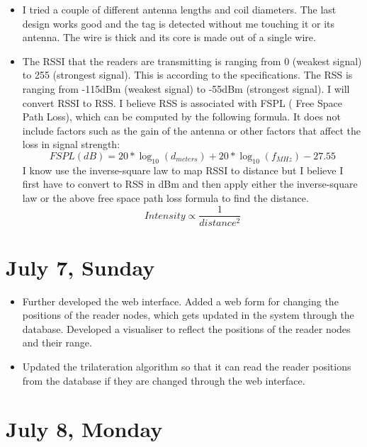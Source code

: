 \documentclass[a4paper,12pt]{article}
\begin{document}
\begin{itemize}
	\item I tried a couple of different antenna lengths and coil diameters. The last design works good and the tag is detected without me touching it or its antenna. The wire is thick and its core is made out of a single wire.
	\item The RSSI that the readers are transmitting is ranging from 0 (weakest signal) to 255 (strongest signal). This is according to the specifications. The RSS is ranging from -115dBm (weakest signal) to -55dBm (strongest signal). I will convert RSSI to RSS. I believe RSS is associated with FSPL ( Free Space Path Loss), which can be computed by the following formula. It does not include factors such as the gain of the antenna or other factors that affect the loss in signal strength:
	\[ FSPL(dB) = 20*\log_{10}(d_{meters}) + 20*\log_{10}(f_{MHz}) - 27.55 \]
	I know use the inverse-square law to map RSSI to distance but I believe I first have to convert to RSS in dBm and then apply either the inverse-square law or the above free space path loss formula to find the distance.
	\[ Intensity \propto \frac{1}{distance^{2}} \]
	 
\end{itemize}

\section{July 7, Sunday}

\begin{itemize}
	\item Further developed the web interface. Added a web form for changing the positions of the reader nodes, which gets updated in the system through the database. Developed a visualiser to reflect the positions of the reader nodes and their range.
	\item Updated the trilateration algorithm so that it can read the reader positions from the database if they are changed through the web interface.
\end{itemize}

\section{July 8, Monday}
\end{document}
